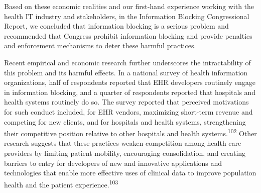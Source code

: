\documentclass[twoside,11pt]{article}
\begin{document}
          Based on these economic realities and our first-hand experience working with the health IT industry and stakeholders, in the Information Blocking Congressional Report, we concluded that information blocking is a serious problem and recommended that Congress prohibit information blocking and provide penalties and enforcement mechanisms to deter these harmful practices.


          Recent empirical and economic research further underscores the intractability of this problem and its harmful effects. In a national survey of health information organizations, half of respondents reported that EHR developers routinely engage in information blocking, and a quarter of respondents reported that hospitals and health systems routinely do so. The survey reported that perceived motivations for such conduct included, for EHR vendors, maximizing short-term revenue and competing for new clients, and for hospitals and health systems, strengthening their competitive position relative to other hospitals and health systems.\textsuperscript{102}
             Other research suggests that these practices weaken competition among health care providers by limiting patient mobility, encouraging consolidation, and creating barriers to entry for developers of new and innovative applications and technologies that enable more effective uses of clinical data to improve population health and the patient experience.\textsuperscript{103}
            
          




\end{document}
